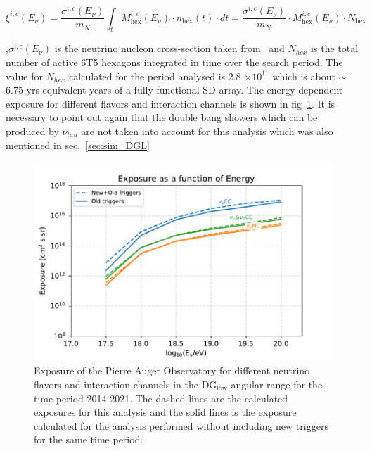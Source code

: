 \begin{equation}
  \xi^{i,c}(E_{\nu}) = \frac{\sigma^{i,c}(E_{\nu})}{m_N} \int_{t} M_{\text{hex}}^{i,c}(E_{\nu}) \cdot n_{\text{hex}}(t) \cdot dt =  \frac{\sigma^{i,c}(E_{\nu})}{m_N} \cdot M_{\text{hex}}^{i,c}(E_{\nu}) \cdot N_{\text{hex}}
\end{equation}

,$\sigma^{i,c}(E_{\nu})$ is the neutrino nucleon cross-section taken from~\cite{Cooper-Sarkar:2011jtt} and $N_{hex}$ is the total number of active 6T5 hexagons integrated in time over the search period. The value for $N_{hex}$ calculated for the period analysed is 2.8 $\times 10^{11}$ which is about $\sim$6.75 yrs equivalent years of a fully functional SD array. The energy dependent exposure for different flavors and interaction channels is shown in fig~\ref{fig:Exp_flavors_comp}. It is necessary to point out again that the double bang showers which can be produced by $\nu_{tau}$ are not taken into account for this analysis which was also mentioned in sec.~\ref{sec:sim_DGL} 

\begin{figure}[t!]
  \centering
  \includegraphics[width=14.5cm]{thesis_figures/ExpLimits/Exposure_comp_all_anotated_new_sim_optim.pdf}
  \caption{Exposure of the Pierre Auger Observatory for different neutrino flavors and interaction channels in the DG$_{\text{low}}$ angular range for the time period 2014-2021. The dashed lines are the calculated exposures for this analysis and the solid lines is the exposure calculated for the analysis performed without including new triggers for the same time period.}
  \label{fig:Exp_flavors_comp}
\end{figure}

